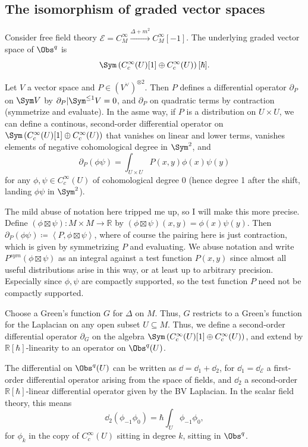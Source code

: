 \subsection{The isomorphism of graded vector spaces}

Consider free field theory $\mathcal{E} =C^\infty _M\xrightarrow{\Delta +m^2}C^\infty _M[-1]$. The underlying graded vector space of $\Obs^{q} $ is
\[
	\Sym \left( C^\infty _c(U)[1]\oplus C^\infty _c(U) \right) [\hbar ]
.\]

Let $V$ a vector space and $P\in (V^{\vee } )^{\otimes 2} $. Then $P$ defines a differential operator $\partial _P$ on $\Sym V$ by $\partial _P|\Sym ^{\leq 1}V = 0$, and $\partial _P$ on quadratic terms by contraction (symmetrize and evaluate). In the asme way, if $P$ is a distribution on $U\times U$, we can define a continous, second-order differential operator on $\Sym \left( C^\infty _c(U)[1]\oplus C^\infty _c(U) \right) $ that vanishes on linear and lower terms, vanishes elements of negative cohomological degree in $\Sym ^2$, and
\[
	\partial _P(\phi \psi ) = \int_{U\times U} P(x,y)\phi (x)\psi (y)
\]
for any $\phi ,\psi \in C^\infty _c(U)$ of cohomological degree 0 (hence degree 1 after the shift, landing $\phi \psi $ in $\Sym ^2$).

The mild abuse of notation here tripped me up, so I will make this more precise. Define $(\phi \boxtimes \psi ): M\times M \to \mathbb{R} $ by $(\phi \boxtimes \psi )(x,y)=\phi (x)\psi (y)$. Then $\partial_P(\phi \psi )\coloneqq \left\langle P,\phi \boxtimes \psi  \right\rangle $, where of course the pairing here is just contraction, which is given by symmetrizing $P$ and evaluating. We abuse notation and write $P^{sym} (\phi \boxtimes \psi )$ as an integral against a test function $P(x,y)$ since almost all useful distributions arise in this way, or at least up to arbitrary precision. Especially since $\phi ,\psi $ are compactly supported, so the test function $P$ need not be compactly supported.

Choose a Green's function $G$ for $\Delta $ on $M$. Thus, $G$ restricts to a Green's function for the Laplacian on any open subset $U\subseteq M$. Thus, we define a second-order differential operator $\partial _G$ on the algebra $\Sym \left( C^\infty _c(U)[1]\oplus C^\infty _c(U) \right) $, and extend by $\mathbb{R} [\hbar ]$-linearity to an operator on $\Obs^{q} (U)$.

The differential on $\Obs^{q} (U)$ can be written as $\dd =\dd _1 + \dd _2$, for $\dd _1=\dd _{\mathcal{E} }$ a first-order differential operator arising from the space of fields, and $\dd _2$ a second-order $\mathbb{R} [\hbar ]$-linear differential operator given by the BV Laplacian. In the scalar field theory, this means
\[
	\dd _2(\phi _{-1} \phi _0) = \hbar \int_{U} \phi _{-1} \phi _0,
\]
for $\phi _k$ in the copy of $C^\infty _c(U)$ sitting in degree $k$, sitting in $\Obs^{q} $.

